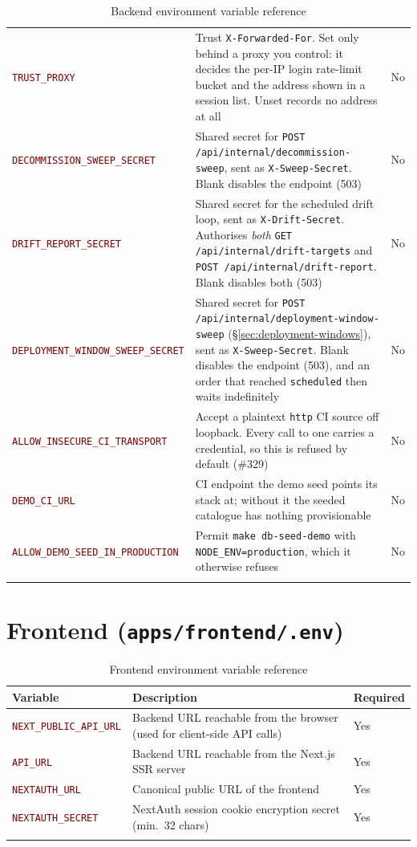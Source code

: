 \documentclass[12pt,a4paper,twoside]{report}
\newcommand{\code}[1]{\texttt{#1}}
\newcommand{\env}[1]{\texttt{\textcolor{Maroon}{#1}}}
\begin{document}
\begin{longtable}{@{}L{4.5cm}L{7.5cm}l@{}}
  \env{TRUST\_PROXY}            & Trust \code{X-Forwarded-For}. Set only behind a proxy you control: it decides the per-IP login rate-limit bucket and the address shown in a session list. Unset records no address at all & No \\
  \env{DECOMMISSION\_SWEEP\_SECRET} & Shared secret for \code{POST /api/internal/decommission-sweep}, sent as \code{X-Sweep-Secret}. Blank disables the endpoint (503) & No \\
  \env{DRIFT\_REPORT\_SECRET}   & Shared secret for the scheduled drift loop, sent as \code{X-Drift-Secret}. Authorises \emph{both} \code{GET /api/internal/drift-targets} and \code{POST /api/internal/drift-report}. Blank disables both (503) & No \\
  \env{DEPLOYMENT\_WINDOW\_SWEEP\_SECRET} & Shared secret for \code{POST /api/internal/deployment-window-sweep} (\S\ref{sec:deployment-windows}), sent as \code{X-Sweep-Secret}. Blank disables the endpoint (503), and an order that reached \code{scheduled} then waits indefinitely & No \\
  \env{ALLOW\_INSECURE\_CI\_TRANSPORT} & Accept a plaintext \code{http} CI source off loopback. Every call to one carries a credential, so this is refused by default (\#329) & No \\
  \env{DEMO\_CI\_URL}           & CI endpoint the demo seed points its stack at; without it the seeded catalogue has nothing provisionable & No \\
  \env{ALLOW\_DEMO\_SEED\_IN\_PRODUCTION} & Permit \code{make db-seed-demo} with \code{NODE\_ENV=production}, which it otherwise refuses & No \\
  \bottomrule
  \caption{Backend environment variable reference}
  \label{tab:envvars-backend}
\end{longtable}

\section*{Frontend (\texttt{apps/frontend/.env})}

\begin{longtable}{@{}L{4.5cm}L{7.5cm}l@{}}
  \toprule
  \textbf{Variable} & \textbf{Description} & \textbf{Required} \\
  \midrule
  \endhead
  \env{NEXT\_PUBLIC\_API\_URL} & Backend URL reachable from the browser (used for client-side API calls) & Yes \\
  \env{API\_URL}               & Backend URL reachable from the Next.js SSR server & Yes \\
  \env{NEXTAUTH\_URL}          & Canonical public URL of the frontend            & Yes \\
  \env{NEXTAUTH\_SECRET}       & NextAuth session cookie encryption secret (min.\ 32 chars) & Yes \\
  \bottomrule
  \caption{Frontend environment variable reference}
  \label{tab:envvars-frontend}
\end{longtable}
\end{document}
